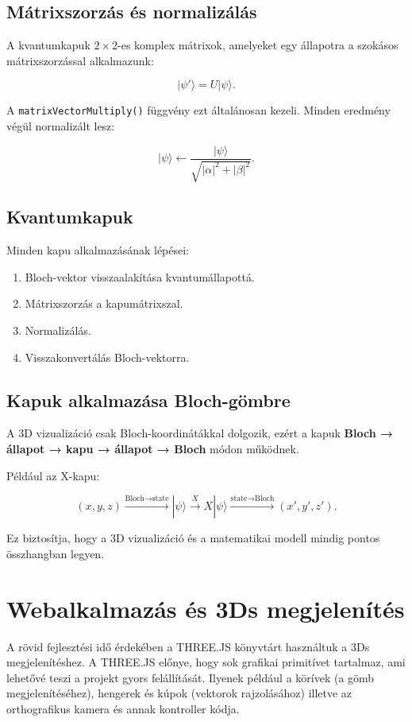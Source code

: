 \documentclass[12pt]{article}
\begin{document}
	\subsection{Mátrixszorzás és normalizálás}
	A kvantumkapuk \(2\times2\)-es komplex mátrixok, amelyeket egy állapotra
	a szokásos mátrixszorzással alkalmazunk:
	
	\[
	|\psi'\rangle = U|\psi\rangle.
	\]
	
	A \texttt{matrixVectorMultiply()} függvény ezt általánosan kezeli.
	Minden eredmény végül normalizált lesz:
	
	\[
	|\psi\rangle \leftarrow \frac{|\psi\rangle}{\sqrt{|\alpha|^2 + |\beta|^2}}.
	\]

	\subsection{Kvantumkapuk}
	
	Minden kapu alkalmazásának lépései:
	
	\begin{enumerate}
		\item Bloch-vektor visszaalakítása kvantumállapottá.
		\item Mátrixszorzás a kapumátrixszal.
		\item Normalizálás.
		\item Visszakonvertálás Bloch-vektorra.
	\end{enumerate}
	
	\subsection{Kapuk alkalmazása Bloch-gömbre}
	A 3D vizualizáció csak Bloch-koordinátákkal dolgozik, ezért a kapuk
	\textbf{Bloch → állapot → kapu → állapot → Bloch} módon működnek.
	
	Például az X-kapu:
	
	\[
	(x,y,z) \xrightarrow{\text{Bloch→state}}
	|\psi\rangle \xrightarrow{X}
	X|\psi\rangle \xrightarrow{\text{state→Bloch}}
	(x',y',z').
	\]
	
	Ez biztosítja, hogy a 3D vizualizáció és a matematikai modell mindig
	pontos összhangban legyen.
	
	
	\section{Webalkalmazás és 3Ds megjelenítés}
	A rövid fejlesztési idő érdekében a THREE.JS könyvtárt használtuk a 3Ds megjelenítéshez. A THREE.JS előnye, hogy sok grafikai primitívet tartalmaz, ami lehetővé teszi a projekt gyors felállítását. Ilyenek például a körívek (a gömb megjelenítéséhez), hengerek és kúpok (vektorok rajzolásához) illetve az orthografikus kamera és annak kontroller kódja.
	
\end{document}
